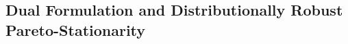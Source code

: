 \documentclass[twoside]{article} %
\theoremstyle{plain}
\theoremstyle{definition}
\theoremstyle{remark}
\begin{document}





    
\subsection{Dual Formulation and Distributionally Robust Pareto-Stationarity}

\end{document}

